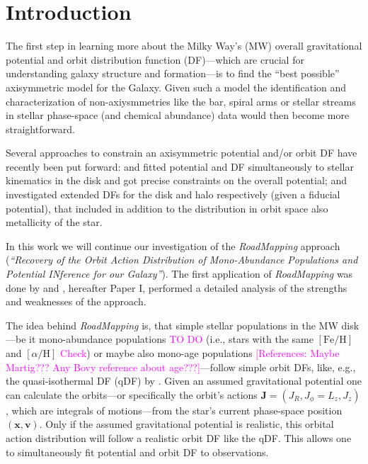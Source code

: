 \documentclass[iop,revtex4,numberedappendix,appendixfloats]{emulateapj}
\newcommand{\vect}[1]{\boldsymbol{#1}}
\newcommand{\RM}{{\sl RoadMapping}}
\newcommand{\Wilma}[1]{\textcolor{Magenta}{#1}}
\begin{document}
\section{Introduction}

The first step in learning more about the Milky Way's (MW) overall gravitational potential and orbit distribution function (DF)---which are crucial for understanding galaxy structure and formation---is to find the ``best possible'' axisymmetric model for the Galaxy. Given such a model the identification and characterization of non-axiysmmetries like the bar, spiral arms or stellar streams in stellar phase-space (and chemical abundance) data would then become more straightforward.

Several approaches to constrain an axisymmetric potential and/or orbit DF have recently been put forward: \citet{2013ApJ...779..115B} and \citet{2014MNRAS.445.3133P} fitted potential and DF simultaneously to stellar kinematics in the disk and got precise constraints on the overall potential; \citet{2015MNRAS.449.3479S} and \citet{2016MNRAS.tmp..817D} investigated extended DFs for the disk and halo respectively (given a fiducial potential), that included in addition to the distribution in orbit space also metallicity of the star. 

In this work we will continue our investigation of the \RM{} approach (\emph{``Recovery of the Orbit Action Distribution of Mono-Abundance Populations and Potential INference for our Galaxy''}). The first application of \RM{} was done by \citet{2013ApJ...779..115B} and \citet{Trick 2016}, hereafter Paper I, performed a detailed analysis of the strengths and weaknesses of the approach. 

The idea behind \RM{} is, that simple stellar populations in the MW disk---be it mono-abundance populations \citep{Bovyabcd, ting} \Wilma{TO DO} (i.e., stars with the same $[\mathrm{Fe}/\mathrm{H}]$ and $[\alpha/\mathrm{H}]$ \Wilma{Check}) or maybe also mono-age populations \Wilma{[References: Maybe Martig??? Any Bovy reference about age???]}---follow simple orbit DFs, like, e.g., the quasi-isothermal DF (qDF) by \citet{???}. Given an assumed gravitational potential one can calculate the orbits---or specifically the orbit's actions $\vect{J}=(J_R,J_\phi=L_z,J_z)$, which are integrals of motions---from the star's current phase-space position $(\vect{x},\vect{v})$. Only if the assumed gravitational potential is realistic, this orbital action distribution will follow a realistic orbit DF like the qDF. This allows one to simultaneously fit potential and orbit DF to observations.
\end{document}
